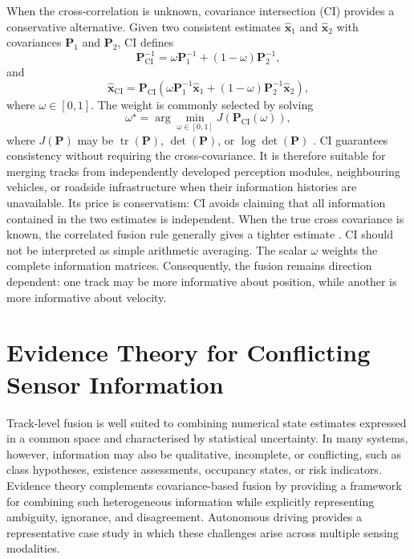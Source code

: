 When the cross-correlation is unknown, covariance intersection (CI)
provides a conservative alternative. Given two consistent estimates
$\widehat{\mathbf{x}}_{1}$ and $\widehat{\mathbf{x}}_{2}$ with covariances
$\mathbf{P}_{1}$ and $\mathbf{P}_{2}$, CI defines
\begin{equation}
\mathbf{P}_{\mathrm{CI}}^{-1}=\omega\mathbf{P}_{1}^{-1}+(1-\omega)\mathbf{P}_{2}^{-1},
\label{eq:ci-cov}
\end{equation}
and
\begin{equation}
\widehat{\mathbf{x}}_{\mathrm{CI}}=\mathbf{P}_{\mathrm{CI}}\left(\omega\mathbf{P}_{1}^{-1}\widehat{\mathbf{x}}_{1}+(1-\omega)\mathbf{P}_{2}^{-1}\widehat{\mathbf{x}}_{2}\right),
\label{eq:ci-est}
\end{equation}
where $\omega\in[0,1]$. The weight is commonly selected by solving
\begin{equation}
\omega^{\star}=\arg\min_{\omega\in[0,1]}J\!\left(\mathbf{P}_{\mathrm{CI}}(\omega)\right),
\label{eq:ci-weight}
\end{equation}
where $J(\mathbf{P})$ may be
$\operatorname{tr}(\mathbf{P})$,
$\det(\mathbf{P})$, or
$\log\det(\mathbf{P})$
\cite{uhlmann1995dynamic,julier1997nondivergent,julier2001general}. CI guarantees consistency without requiring the cross-covariance. It is therefore suitable for merging tracks from independently developed
perception modules, neighbouring vehicles, or roadside infrastructure when their information histories are unavailable. Its price is conservatism: CI avoids claiming that all information contained in the two estimates is independent. When the true cross covariance is known, the correlated fusion rule generally gives a tighter estimate \cite{barshalom2011tracking,julier2001general}. CI should not be interpreted as simple arithmetic averaging. The scalar
$\omega$ weights the complete information matrices. Consequently, the
fusion remains direction dependent: one track may be more informative
about position, while another is more informative about velocity.



%
\section{Evidence Theory for Conflicting Sensor Information}
\label{sec:evidence}
%

Track-level fusion is well suited to combining numerical state estimates expressed in a common space and characterised by statistical uncertainty. In many systems, however, information may also be qualitative, incomplete, or conflicting, such as class hypotheses, existence assessments, occupancy states, or risk indicators. Evidence theory complements covariance-based fusion by providing a framework for combining such heterogeneous information while explicitly representing ambiguity, ignorance, and disagreement. Autonomous driving provides a representative case study in which these challenges arise across multiple sensing modalities.

